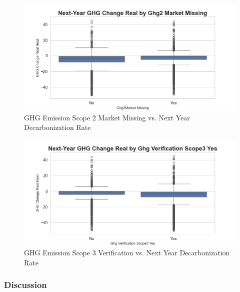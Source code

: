 \begin{figure}[H]
\centering
  \includegraphics[width=\textwidth]{figures/ghg_change_real_next_by_ghg2market_na.png}
\caption{GHG Emission Scope 2 Market Missing vs. Next Year Decarbonization Rate}
\label{fig:ghg_change_real_next_by_ghg2market_na}
\end{figure}

\begin{figure}[H]
\centering
  \includegraphics[width=\textwidth]{figures/ghg_change_real_next_by_ghg_verification_scope3_yes.png}
\caption{GHG Emission Scope 3 Verification vs. Next Year Decarbonization Rate}
\label{fig:ghg_change_real_next_by_ghg_verification_scope3_yes}
\end{figure}


\subsubsection{Discussion}


